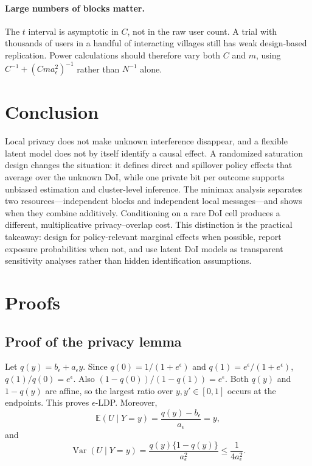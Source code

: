\documentclass[11pt]{article}
\theoremstyle{definition}
\theoremstyle{remark}
\newcommand{\E}{\mathbb{E}}
\newcommand{\Var}{\operatorname{Var}}
\newcommand{\doisig}{a_{\epsilon}}
\begin{document}
\paragraph{Large numbers of blocks matter.}
The $t$ interval is asymptotic in $C$, not in the raw user count. A trial with thousands of
users in a handful of interacting villages still has weak design-based replication. Power
calculations should therefore vary both $C$ and $m$, using
$C^{-1}+(Cm\doisig^2)^{-1}$ rather than $N^{-1}$ alone.

\section{Conclusion}

Local privacy does not make unknown interference disappear, and a flexible latent model does
not by itself identify a causal effect. A randomized saturation design changes the situation:
it defines direct and spillover policy effects that average over the unknown DoI, while one
private bit per outcome supports unbiased estimation and cluster-level inference. The minimax
analysis separates two resources---independent blocks and independent local messages---and
shows when they combine additively. Conditioning on a rare DoI cell produces a different,
multiplicative privacy--overlap cost. This distinction is the practical takeaway: design for
policy-relevant marginal effects when possible, report exposure probabilities when not, and use
latent DoI models as transparent sensitivity analyses rather than hidden identification
assumptions.

\appendix

\section{Proofs}
\label{app:proofs}

\subsection{Proof of the privacy lemma}

Let $q(y)=b_{\epsilon}+\doisig y$. Since
$q(0)=1/(1+e^{\epsilon})$ and $q(1)=e^{\epsilon}/(1+e^{\epsilon})$,
$q(1)/q(0)=e^{\epsilon}$. Also
$(1-q(0))/(1-q(1))=e^{\epsilon}$. Both $q(y)$ and $1-q(y)$ are affine, so the largest ratio
over $y,y'\in[0,1]$ occurs at the endpoints. This proves $\epsilon$-LDP. Moreover,
\[
  \E(U\mid Y=y)=\frac{q(y)-b_{\epsilon}}{\doisig}=y,
\]
and
\[
  \Var(U\mid Y=y)=\frac{q(y)\{1-q(y)\}}{\doisig^2}
  \le \frac{1}{4\doisig^2}.
\]
\end{document}
